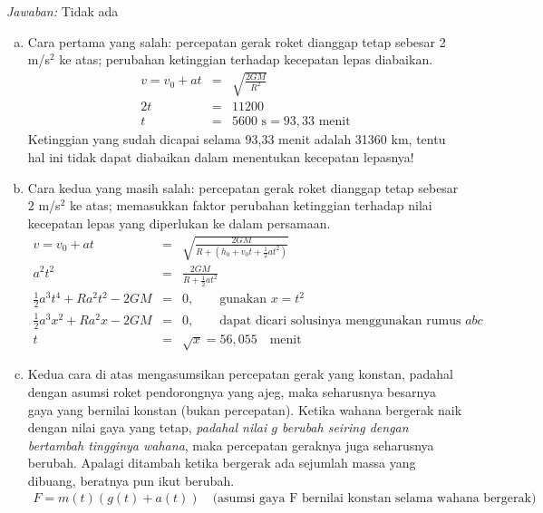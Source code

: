 \documentclass[11pt,fleqn]{exam}
\begin{document}
\begin{questions}
\textit{Jawaban: } Tidak ada

\begin{enumerate}[a)]
\item Cara pertama yang salah: percepatan gerak roket dianggap tetap sebesar 2 m/s$^2$ ke atas; perubahan ketinggian terhadap kecepatan lepas diabaikan.
\begin{eqnarray*}
v = v_0 + at &=& \sqrt{\frac{2GM}{R^2}}\\
2t &=& 11200\\
t &=& 5600\text{   s} = 93,33 \text{  menit}
\end{eqnarray*}
Ketinggian yang sudah dicapai selama 93,33 menit adalah 31360 km, tentu hal ini tidak dapat diabaikan dalam menentukan kecepatan lepasnya!

\item Cara kedua yang masih salah: percepatan gerak roket dianggap tetap sebesar 2 m/s$^2$ ke atas; memasukkan faktor perubahan ketinggian terhadap nilai kecepatan lepas yang diperlukan ke dalam persamaan.
\begin{eqnarray*}
v = v_0 + at &=& \sqrt{\frac{2GM}{R+(h_0 + v_0 t + \frac{1}{2} a t^2)}}\\
a^2 t^2 &=& \frac{2GM}{R + \frac{1}{2} a t^2}\\
\frac{1}{2} a^3 t^4 + R a^2 t^2 - 2GM &=& 0, \qquad \text{gunakan  } x = t^2\\
\frac{1}{2} a^3 x^2 + R a^2 x - 2GM &=& 0, \qquad \text{dapat dicari solusinya menggunakan rumus } abc\\
t &=& \sqrt{x} = 56,055 \quad \text{menit}
\end{eqnarray*}

\item Kedua cara di atas mengasumsikan percepatan gerak yang konstan, padahal dengan asumsi roket pendorongnya yang ajeg, maka seharusnya besarnya gaya yang bernilai konstan (bukan percepatan). Ketika wahana bergerak naik dengan nilai gaya yang tetap, \textit{padahal nilai $g$ berubah seiring dengan bertambah tingginya wahana}, maka percepatan geraknya juga seharusnya berubah. Apalagi ditambah ketika bergerak ada sejumlah massa yang dibuang, beratnya pun ikut berubah.
\begin{eqnarray*}
F = m(t) (g(t) + a(t)) \quad \text{(asumsi gaya F bernilai konstan selama wahana bergerak)}
\end{eqnarray*}

\end{enumerate}




\end{questions}
\end{document}
